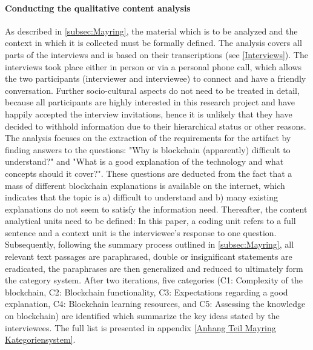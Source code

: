 \paragraph{Conducting the qualitative content analysis} As described in \ref{subsec:Mayring}, the material which is to be analyzed and the context in which it is collected must be formally defined. The analysis covers all parts of the interviews and is based on their transcriptions (see \ref{Interviews}). The interviews took place either in person or via a personal phone call, which allows the two participants (interviewer and interviewee) to connect and have a friendly conversation. Further socio-cultural aspects do not need to be treated in detail, because all participants are highly interested in this research project and have happily accepted the interview invitations, hence it is unlikely that they have decided to withhold information due to their hierarchical status or other reasons. The analysis focuses on the extraction of the requirements for the artifact by finding answers to the questions: "Why is blockchain (apparently) difficult to understand?" and "What is a good explanation of the technology and what concepts should it cover?". These questions are deducted from the fact that a mass of different blockchain explanations is available on the internet, which indicates that the topic is a) difficult to understand and b) many existing explanations do not seem to satisfy the information need. Thereafter, the content analytical units need to be defined: In this paper, a coding unit refers to a full sentence and a context unit is the interviewee's response to one question. Subsequently, following the summary process outlined in \ref{subsec:Mayring}, all relevant text passages are paraphrased, double or insignificant statements are eradicated, the paraphrases are then generalized and reduced to ultimately form the category system. After two iterations, five categories (C1: Complexity of the blockchain, C2: Blockchain functionality, C3: Expectations regarding a good explanation, C4: Blockchain learning resources, and C5: Assessing the knowledge on blockchain) are identified which summarize the key ideas stated by the interviewees. The full list is presented in appendix \ref{Anhang Teil Mayring Kategoriensystem}.

